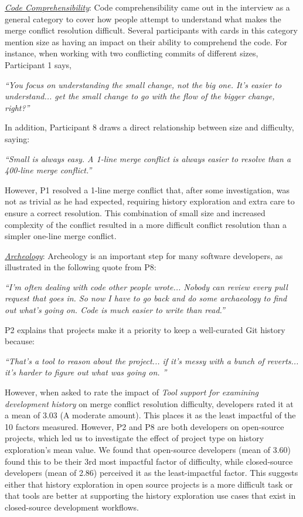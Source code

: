 \underline{\textit{Code Comprehensibility}}:
Code comprehensibility came out in the interview as a general category to cover how people attempt to understand what makes the merge conflict resolution difficult. Several participants with cards in this category mention size as having an impact on their ability to comprehend the code. For instance, when working with two conflicting commits of different sizes, Participant 1 says,
\begin{displayquote}
\textit{``You focus on understanding the small change, not the big one. It's easier to understand... get the small change to go with the flow of the bigger change, right?''}
\end{displayquote}	
In addition, Participant 8 draws a direct relationship between size and difficulty, saying:
\begin{displayquote}
\textit{``Small is always easy. A 1-line merge conflict is always easier to resolve than a 400-line merge conflict.''}
\end{displayquote}
However, P1 resolved a 1-line merge conflict that, after some investigation, was not as trivial as he had expected, requiring history exploration and extra care to ensure a correct resolution. This combination of small size and increased complexity of the conflict resulted in a more difficult conflict resolution than a simpler one-line merge conflict.

\underline{\textit{Archeology}}:
Archeology is an important step for many software developers, as illustrated in the following quote from P8:
\begin{displayquote}
\textit{``I'm often dealing with code other people wrote... Nobody can review every pull request that goes in. So now I have to go back and do some archaeology to find out what's going on. Code is much easier to write than read.''}
\end{displayquote}
P2 explains that projects make it a priority to keep a well-curated Git history because:
\begin{displayquote}
\textit{``That's a tool to reason about the project... if it's messy with a bunch of reverts... it's harder to figure out what was going on.	''}
\end{displayquote}

However, when asked to rate the impact of \textit{Tool support for examining development history} on merge conflict resolution difficulty, developers rated it at a mean of 3.03 (A moderate amount). This places it as the least impactful of the 10 factors measured. However, P2 and P8 are both developers on open-source projects, which led us to investigate the effect of project type on history exploration's mean value. We found that open-source developers (mean of 3.60) found this to be their 3rd most impactful factor of difficulty, while closed-source developers (mean of 2.86) perceived it as the least-impactful factor. This suggests either that history exploration in open source projects is a more difficult task or that tools are better at supporting the history exploration use cases that exist in closed-source development workflows.

